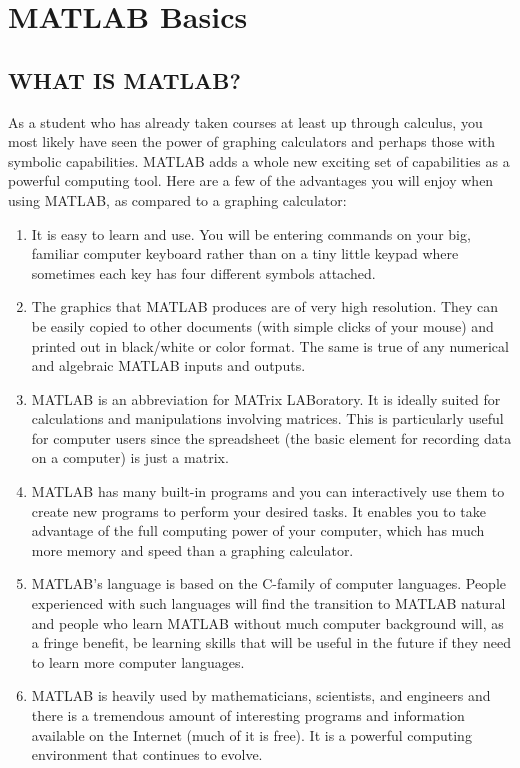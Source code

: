 \documentclass[../main.tex]{subfiles}
\begin{document}
\chapter{MATLAB Basics}

\section{ WHAT IS MATLAB?}

\noindent As a student who has already taken courses at least up through calculus, you most
likely have seen the power of graphing calculators and perhaps those with
symbolic capabilities. MATLAB adds a whole new exciting set of capabilities as
a powerful computing tool. Here are a few of the advantages you will enjoy when
using MATLAB, as compared to a graphing calculator:

\begin{enumerate}
\item It is easy to learn and use. You will be entering commands on your big,
familiar computer keyboard rather than on a tiny little keypad where
sometimes each key has four different symbols attached.
\item The graphics that MATLAB produces are of very high resolution. They can
be easily copied to other documents (with simple clicks of your mouse) and
printed out in black/white or color format. The same is true of any numerical
and algebraic MATLAB inputs and outputs.
\item MATLAB is an abbreviation for MATrix LABoratory. It is ideally suited for
calculations and manipulations involving matrices. This is particularly useful
for computer users since the spreadsheet (the basic element for recording data
on a computer) is just a matrix.
\item MATLAB has many built-in programs and you can interactively use them to
create new programs to perform your desired tasks. It enables you to take
advantage of the full computing power of your computer, which has much
more memory and speed than a graphing calculator.
\item MATLAB's language is based on the C-family of computer languages.
People experienced with such languages will find the transition to MATLAB
natural and people who learn MATLAB without much computer background
will, as a fringe benefit, be learning skills that will be useful in the future if
they need to learn more computer languages.
\item MATLAB is heavily used by mathematicians, scientists, and engineers and
there is a tremendous amount of interesting programs and information
available on the Internet (much of it is free). It is a powerful computing
environment that continues to evolve.
\end{enumerate}
\end{document}
